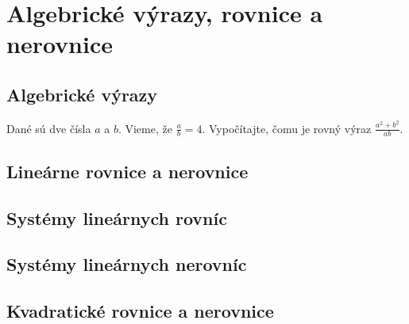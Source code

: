 \chapter{Algebrické výrazy, rovnice a nerovnice}

\section{Algebrické výrazy}

\begin{example}
	Dané sú dve čísla $a$ a $b$. Vieme, že $\frac{a}{b} = 4$. Vypočítajte, čomu je rovný výraz $\frac{a^2 + b^2}{ab}$.
\end{example}

\section{Lineárne rovnice a nerovnice}

\section{Systémy lineárnych rovníc}

\section{Systémy lineárnych nerovníc}

\section{Kvadratické rovnice a nerovnice}